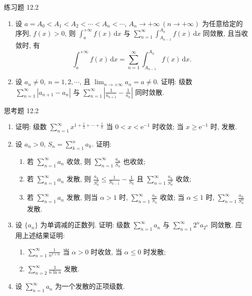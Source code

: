 \begin{exblock}{练习题 12.2}
\begin{enumerate}
  \item 设 $a=A_{0}<A_{1}<A_{2}<\cdots<A_{n}<\cdots$, $A_{n}\to+\infty\ (n\to+\infty)$ 为任意给定的序列, $f(x)>0$, 则 $\int_{a}^{+\infty}f(x)\,\mathrm{d}x$ 与 $\sum_{n=1}^{\infty}\int_{A_{n-1}}^{A_{n}}f(x)\,\mathrm{d}x$ 同敛散, 且当收敛时, 有
  \[
    \int_{a}^{+\infty}f(x)\,\mathrm{d}x=\sum_{n=1}^{\infty}\int_{A_{n-1}}^{A_{n}}f(x)\,\mathrm{d}x.
\]
  \item 设 $a_{n}\neq0,\ n=1,2,\cdots$, 且 $\lim_{n\to+\infty}a_{n}=a\neq0$. 证明: 级数 $\sum_{n=1}^{\infty}\left|a_{n+1}-a_{n}\right|$ 与 $\sum_{n=1}^{\infty}\left|\frac{1}{a_{n+1}}-\frac{1}{a_{n}}\right|$ 同时敛散.
\end{enumerate}
\end{exblock}

\begin{exblock}{思考题 12.2}
\begin{enumerate}
  \item 证明: 级数 $\sum_{n=1}^{\infty}x^{1+\frac{1}{2}+\cdots+\frac{1}{n}}$ 当 $0<x<\mathrm{e}^{-1}$ 时收敛; 当 $x\geqslant\mathrm{e}^{-1}$ 时, 发散.
  \item 设 $a_{n}>0$, $S_{n}=\sum_{k=1}^{n}a_{k}$. 证明:
  \begin{enumerate}
    \item[(1)] 若 $\sum_{n=1}^{\infty}a_{n}$ 收敛, 则 $\sum_{n=1}^{\infty}\frac{a_{n}}{S_{n}}$ 也收敛;
    \item[(2)] 若 $\sum_{n=1}^{\infty}a_{n}$ 发散, 则 $\frac{a_{k}}{S_{n}^{2}}\leqslant\frac{1}{S_{k-1}}-\frac{1}{S_{k}}$ 且 $\sum_{n=1}^{\infty}\frac{a_{n}}{S_{n}^{2}}$ 收敛;
    \item[(3)] 若 $\sum_{n=1}^{\infty}a_{n}$ 发散, 则当 $\alpha>1$ 时, $\sum_{n=1}^{\infty}\frac{a_{n}}{S_{n}}$ 收敛; 当 $\alpha\leqslant1$ 时, $\sum_{n=1}^{\infty}\frac{a_{n}}{S_{n}^{\alpha}}$ 发散.
  \end{enumerate}
  \item 设 $\{a_{n}\}$ 为单调减的正数列. 证明: 级数 $\sum_{n=1}^{\infty}a_{n}$ 与 $\sum_{n=1}^{\infty}2^{n}a_{2^{n}}$ 同敛散. 应用上述结果证明:
  \begin{enumerate}
    \item[(1)] $\sum_{n=1}^{\infty}\frac{1}{n^{1+\alpha}}$ 当 $\alpha>0$ 时收敛, 当 $\alpha\leqslant0$ 时发散;
    \item[(2)] $\sum_{n=2}^{\infty}\frac{1}{n\ln n}$ 发散.
  \end{enumerate}
  \item 设 $\sum_{n=1}^{\infty}a_{n}$ 为一个发散的正项级数.
  \begin{enumerate}

\end{enumerate}
\end{enumerate}
\end{exblock}

